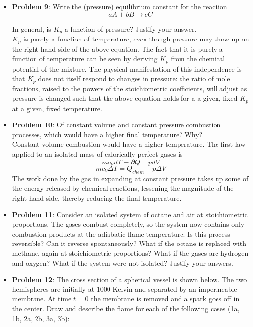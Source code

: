 \documentclass[11pt]{article}
\newcommand{\Item}[1]{\item \textbf{#1}:}
\newcommand{\CenteredBoxed}[1]{\begin{center}\boxed{#1}\end{center}}
\newcommand{\Problem}[1]{\Item{Problem #1}}
\begin{document}
\begin{itemize}
\Problem{9} Write the (pressure) equilibrium constant for the reaction 
$$aA + bB \to cC$$

\CenteredBoxed{K_p = \frac{\chi_C^c}{\chi_A^a\chi_B^b}p^{(c-(a+b))}}

In general, is $K_p$ a function of pressure? Justify your answer.\\

$K_p$ is purely a function of temperature, even though pressure may show up on the right hand side of the above equation. The fact that it is purely a function of temperature can be seen by deriving $K_p$ from the chemical potential of the mixture. The physical manifestation of this independence is that $K_p$ does not itself respond to changes in pressure; the ratio of mole fractions, raised to the powers of the stoichiometric coefficients, will adjust as pressure is changed such that the above equation holds for a a given, fixed $K_p$ at a given, fixed temperature.

\Problem{10} Of constant volume and constant pressure combustion processes, which would have a higher final temperature? Why?\\

Constant volume combustion would have a higher temperature. The first law applied to an isolated mass of calorically perfect gases is
$$mc_VdT = \partial Q - pdV$$
$$mc_V\Delta T = Q_{chem} - p\Delta V$$
The work done by the gas in expanding at constant pressure takes up some of the energy released by chemical reactions, lessening the magnitude of the right hand side, thereby reducing the final temperature.

\Problem{11} Consider an isolated system of octane and air at stoichiometric proportions. The gases combust completely, so the system now contains only combustion products at the adiabatic flame temperature. Is this process reversible? Can it reverse spontaneously? What if the octane is replaced with methane, again at stoichiometric proportions? What if the gases are hydrogen and oxygen? What if the system were not isolated? Justify your answers.\\

\Problem{12} The cross section of a spherical vessel is shown below. The two hemispheres are initially at 1000 Kelvin and separated by an impermeable membrane. At time $t=0$ the membrane is removed and a spark goes off in the center. Draw and describe the flame for each of the following cases (1a, 1b, 2a, 2b, 3a, 3b):\\


\end{itemize}
\end{document}
